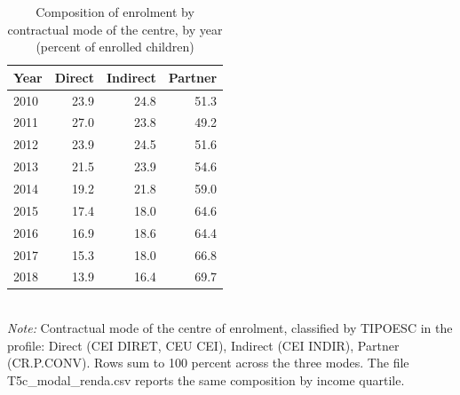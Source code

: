 \begin{table}[htbp]\centering
\caption{Composition of enrolment by contractual mode of the centre, by year (percent of enrolled children)}
\label{tab:T5c_modal}
\small
\setlength{\tabcolsep}{4pt}
\begin{tabular}{lrrr}
\toprule
Year & Direct & Indirect & Partner \\
\midrule
2010 & 23.9 & 24.8 & 51.3 \\
2011 & 27.0 & 23.8 & 49.2 \\
2012 & 23.9 & 24.5 & 51.6 \\
2013 & 21.5 & 23.9 & 54.6 \\
2014 & 19.2 & 21.8 & 59.0 \\
2015 & 17.4 & 18.0 & 64.6 \\
2016 & 16.9 & 18.6 & 64.4 \\
2017 & 15.3 & 18.0 & 66.8 \\
2018 & 13.9 & 16.4 & 69.7 \\
\bottomrule
\end{tabular}
\\[3pt]{\footnotesize \textit{Note:} Contractual mode of the centre of enrolment, classified by TIPOESC in the profile: Direct (CEI DIRET, CEU CEI), Indirect (CEI INDIR), Partner (CR.P.CONV). Rows sum to 100 percent across the three modes. The file T5c\_modal\_renda.csv reports the same composition by income quartile.}
\end{table}
